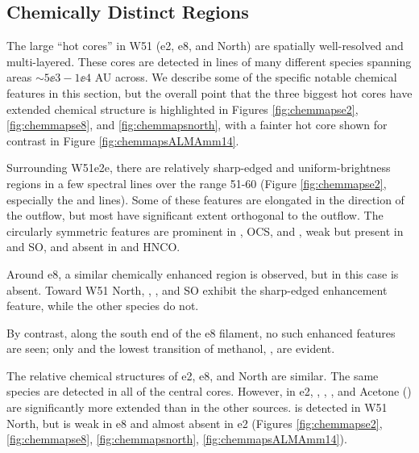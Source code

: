 \documentclass[twocolumn]{aastex61}
\begin{document}
\subsection{Chemically Distinct Regions}
\label{sec:chemistrymaps}
\label{sec:chemistrymapsobs}
The large ``hot cores'' in W51 (e2, e8, and North) are spatially well-resolved
and multi-layered.  These cores are detected in lines of many different species
spanning areas $\sim5\ee{3}-1\ee{4}$ AU across.  We describe some of the
specific notable chemical features in this section, but the overall point that
the three biggest hot cores have extended chemical structure is highlighted in
Figures \ref{fig:chemmapse2}, \ref{fig:chemmapse8}, and
\ref{fig:chemmapsnorth}, with a fainter hot core shown for contrast in Figure
\ref{fig:chemmapsALMAmm14}.

Surrounding W51e2e, there are relatively sharp-edged and uniform-brightness
regions in a few spectral lines over the range 51-60 \kms (Figure
\ref{fig:chemmapse2}, especially the \methanol and \methylformate lines).  Some
of these features are elongated in the direction
of the outflow, but most have significant extent orthogonal to the outflow.
The circularly symmetric features are prominent in \methanol, OCS, and
\dimethylether, weak but present in \formaldehyde and SO, and absent in
\cyanoacetylene and HNCO.

Around e8, a similar chemically enhanced region is observed, but in this case
\dimethylether is absent.  Toward W51 North, \methanol, \formaldehyde, and SO
exhibit the sharp-edged enhancement feature, while the other species do not.

By contrast, along the south end of the e8 filament, no such enhanced features
are seen; only \formaldehyde and the lowest transition of methanol, \methanol
\fourtwotwo, are evident.

The relative chemical structures of e2, e8, and North are  similar.
The same species are detected in all of the central cores.  However, in e2,
\dimethylether, \methylformate, \ethylcyanide, and Acetone (\acetone) are
significantly more extended than in the other sources.
\gaucheethanol is detected in W51 North, but is weak in e8 and almost absent
in e2 (Figures \ref{fig:chemmapse2}, \ref{fig:chemmapse8},
\ref{fig:chemmapsnorth}, \ref{fig:chemmapsALMAmm14}).
\end{document}
